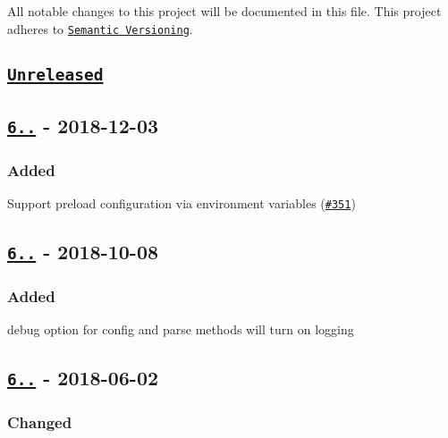 All notable changes to this project will be documented in this file. This project adheres to \href{http://semver.org/}{\tt Semantic Versioning}.

\subsection*{\href{https://github.com/motdotla/dotenv/compare/v6.2.0...HEAD}{\tt Unreleased}}

\subsection*{\href{https://github.com/motdotla/dotenv/compare/v6.1.0...v6.2.0}{\tt 6..} -\/ 2018-\/12-\/03}

\subsubsection*{Added}


\begin{DoxyItemize}
\item Support preload configuration via environment variables (\href{https://github.com/motdotla/dotenv/issues/351}{\tt \#351})
\end{DoxyItemize}

\subsection*{\href{https://github.com/motdotla/dotenv/compare/v6.0.0...v6.1.0}{\tt 6..} -\/ 2018-\/10-\/08}

\subsubsection*{Added}


\begin{DoxyItemize}
\item {\ttfamily debug} option for {\ttfamily config} and {\ttfamily parse} methods will turn on logging
\end{DoxyItemize}

\subsection*{\href{https://github.com/motdotla/dotenv/compare/v5.0.0...v6.0.0}{\tt 6..} -\/ 2018-\/06-\/02}

\subsubsection*{Changed}


